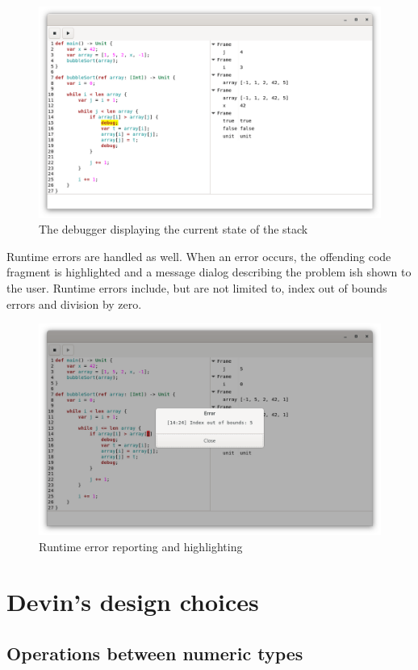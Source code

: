 \documentclass[11pt, american, draft]{PhdThesis}
\begin{document}
  \begin{figure}[H]
    \center
    \includegraphics[width=0.9\linewidth]{5.png}
    \caption{The debugger displaying the current state of the stack}
  \end{figure}

  Runtime errors are handled as well. When an error occurs, the offending code fragment is
  highlighted and a message dialog describing the problem ish shown to the user. Runtime errors
  include, but are not limited to, index out of bounds errors and division by zero.

  \begin{figure}[H]
    \center
    \includegraphics[width=0.9\linewidth]{6.png}
    \caption{Runtime error reporting and highlighting}
  \end{figure}

  \chapter{Devin's design choices}

  \section{Operations between numeric types}
\end{document}
